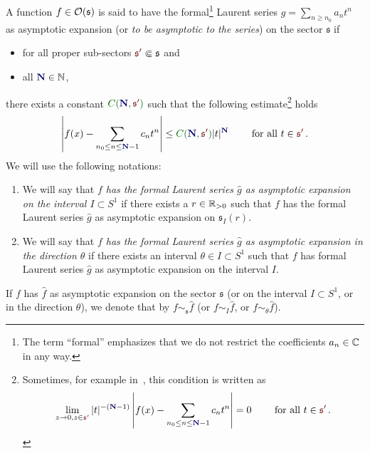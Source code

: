 \begin{defn}
  \def\myN{\textbf{\textcolor{blue!40!black}{N}}}
  \def\mySect{\textcolor{red!40!black}{\mathfrak{s}'}}
  \def\myConst{\textcolor{green!40!black}{C(\myN,\mySect)}}
  A function $f\in\mathcal{O}(\mathfrak{s})$ is said to have the
  formal\footnote{The term ``formal'' emphasizes that we do not restrict the
  coefficients $a_n\in\mathbb{C}$ in any way.} Laurent series
  $\hat g=\sum_{n\geq n_0}a_nt^n$ as asymptotic expansion (or \emph{to be
  asymptotic to the series}) on the sector $\mathfrak{s}$ if
  \begin{itemize}
    \item for all proper sub-sectors $\mySect\Subset\mathfrak{s}$ and
    \item all $\myN\in\N$,
  \end{itemize}
  there exists a constant $\myConst$ such that the following
  estimate\footnote{Sometimes, for example in~\cite{sabbah_cimpa90}, this
    condition is written as
    \[
      \lim_{z\to0,z\in{\mySect}}
      |t|^{-(\myN-1)}
      \left|
        f(x)-\sum_{n_0\leq n\leq \myN-1}c_nt^n
      \right|=0
      \qquad \text{ for all } t\in \mySect \,.
    \]} holds
  \[
    \left|
      f(x)-\sum_{n_0\leq n\leq \myN-1}c_nt^n
    \right|
    \leq \myConst|t|^{\myN} \qquad \text{ for all }t\in \mySect \,.
  \]
  We will use the following notations:
  \begin{enumerate}
    \item We will say that \emph{$f$ has the formal Laurent series $\hat g$ as
      asymptotic expansion on the interval $I\subset S^1$} if there exists a
      $r\in\mathbb{R}_{>0}$ such that $f$ has the formal Laurent series $\hat g$ as
      asymptotic expansion on $\mathfrak{s}_I(r)$.
    \item We will say that \emph{$f$ has the formal Laurent series $\hat g$ as
      asymptotic expansion in the direction $\theta$} if there exists an
      interval $\theta\in I\subset S^1$ such that $f$ has formal Laurent series
      $\hat g$ as asymptotic expansion on the interval $I$.
  \end{enumerate}
\end{defn}
If $f$ has $\hat f$ as asymptotic expansion on the sector $\mathfrak{s}$ (or on
the interval $I\subset S^1$, or in the direction $\theta$), we denote that by
$f\sim_{\mathfrak{s}}\hat f$ (or $f\sim_{I}\hat f$, or
$f\sim_{\theta}\hat f$).\label{page:notationForAsymptoticExpansion}
